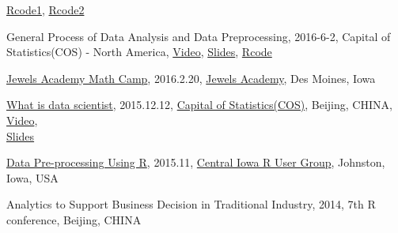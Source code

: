 \documentclass[11pt,]{article}
\renewenvironment{itemize}{
  \begin{list}{}{
    \setlength{\leftmargin}{1.5em}
  }
}{
  \end{list}
}
\begin{document}
\begin{itemize}
  \href{http://hui1987.com/Presentations/COS_NA2016-6-8/Rcode1.R}{Rcode1},
  \href{http://hui1987.com/Presentations/COS_NA2016-6-8/Rcode2.R}{Rcode2}
\item
  General Process of Data Analysis and Data Preprocessing, 2016-6-2,
  Capital of Statistics(COS) - North America,
  \href{https://www.youtube.com/watch?v=N5iWmpTtxTw}{Video},
  \href{http://hui1987.com/Presentations/COS_NA2016-6-2/Presentation_2016_6_2.html}{Slides},
  \href{http://hui1987.com/Presentations/COS_NA2016-6-2/Rcode.R}{Rcode}
\item
  \href{http://scientistcafe.com/Presentations/MathCamp2016_2_20.html}{Jewels
  Academy Math Camp}, 2016.2.20,
  \href{http://jewelsacademy.com/home.html}{Jewels Academy}, Des Moines,
  Iowa
\item
  \href{http://scientistcafe.com/2015/12/12/WhatIsDataScientist.html}{What
  is data scientist}, 2015.12.12,
  \href{http://cos.name/2015/12/20151212salon/}{Capital of
  Statistics(COS)}, Beijing, CHINA,
  \href{http://www.xueqing.tv/course/55}{Video},\\
  \href{http://hui1987.com/Presentations/WhatIsDataScientistCOS_2015_12_12.html}{Slides}
\item
  \href{http://scientistcafe.com/2015/10/28/DataPre-processingUsingR.html}{Data
  Pre-processing Using R}, 2015.11,
  \href{http://www.meetup.com/Central-Iowa-R-User-Group/}{Central Iowa R
  User Group}, Johnston, Iowa, USA
\item
  Analytics to Support Business Decision in Traditional Industry, 2014,
  7th R conference, Beijing, CHINA
\end{itemize}
\end{document}
